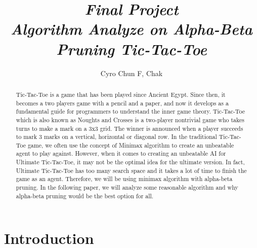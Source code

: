 \documentclass[12pt]{article}
\begin{document}
\title{\emph{Final Project }\\
	\emph{Algorithm Analyze on Alpha-Beta Pruning Tic-Tac-Toe}}
\author{Cyro Chun F, Chak}
\maketitle
\begin{abstract}
Tic-Tac-Toe is a game that has been played since Ancient Egypt. Since then, it becomes a two players game with a pencil and a paper, and now it develops as a fundamental guide for programmers to understand the inner game theory. Tic-Tac-Toe which is also known as Noughts and Crosses is a two-player nontrivial game who takes turns to make a mark on a 3x3 grid. The winner is announced when a player succeeds to mark 3 marks on a vertical, horizontal or diagonal row. In the traditional Tic-Tac-Toe game, we often use the concept of Minimax algorithm to create an unbeatable agent to play against. However, when it comes to creating an unbeatable AI for Ultimate Tic-Tac-Toe, it may not be the optimal idea for the ultimate version. In fact, Ultimate Tic-Tac-Toe has too many search space and it takes a lot of time to finish the game as an agent. Therefore, we will be using minimax algorithm with alpha-beta pruning. In the following paper, we will analyze some reasonable algorithm and why alpha-beta pruning would be the best option for all.
\end{abstract}
\section{Introduction}
\end{document}
